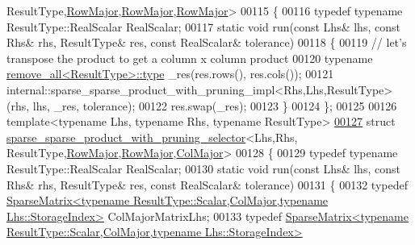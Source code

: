 \begin{DoxyCode}
      ResultType,\hyperlink{group__enums_ggaacded1a18ae58b0f554751f6cdf9eb13acfcde9cd8677c5f7caf6bd603666aae3}{RowMajor},\hyperlink{group__enums_ggaacded1a18ae58b0f554751f6cdf9eb13acfcde9cd8677c5f7caf6bd603666aae3}{RowMajor},\hyperlink{group__enums_ggaacded1a18ae58b0f554751f6cdf9eb13acfcde9cd8677c5f7caf6bd603666aae3}{RowMajor}>
00115 \{
00116   \textcolor{keyword}{typedef} \textcolor{keyword}{typename} ResultType::RealScalar RealScalar;
00117   \textcolor{keyword}{static} \textcolor{keywordtype}{void} run(\textcolor{keyword}{const} Lhs& lhs, \textcolor{keyword}{const} Rhs& rhs, ResultType& res, \textcolor{keyword}{const} RealScalar& tolerance)
00118   \{
00119     \textcolor{comment}{// let's transpose the product to get a column x column product}
00120     \textcolor{keyword}{typename} \hyperlink{group___sparse_core___module}{remove\_all<ResultType>::type} \_res(res.rows(), res.cols());
00121     internal::sparse\_sparse\_product\_with\_pruning\_impl<Rhs,Lhs,ResultType>(rhs, lhs, \_res, tolerance);
00122     res.swap(\_res);
00123   \}
00124 \};
00125 
00126 \textcolor{keyword}{template}<\textcolor{keyword}{typename} Lhs, \textcolor{keyword}{typename} Rhs, \textcolor{keyword}{typename} ResultType>
\hyperlink{struct_eigen_1_1internal_1_1sparse__sparse__product__with__pruning__selector_3_01_lhs_00_01_rhs_e175d5ee5e029960308385b07451d28e}{00127} \textcolor{keyword}{struct }\hyperlink{struct_eigen_1_1internal_1_1sparse__sparse__product__with__pruning__selector}{sparse\_sparse\_product\_with\_pruning\_selector}<Lhs,Rhs,
      ResultType,\hyperlink{group__enums_ggaacded1a18ae58b0f554751f6cdf9eb13acfcde9cd8677c5f7caf6bd603666aae3}{RowMajor},\hyperlink{group__enums_ggaacded1a18ae58b0f554751f6cdf9eb13acfcde9cd8677c5f7caf6bd603666aae3}{RowMajor},\hyperlink{group__enums_ggaacded1a18ae58b0f554751f6cdf9eb13a0cbd4bdd0abcfc0224c5fcb5e4f6669a}{ColMajor}>
00128 \{
00129   \textcolor{keyword}{typedef} \textcolor{keyword}{typename} ResultType::RealScalar RealScalar;
00130   \textcolor{keyword}{static} \textcolor{keywordtype}{void} run(\textcolor{keyword}{const} Lhs& lhs, \textcolor{keyword}{const} Rhs& rhs, ResultType& res, \textcolor{keyword}{const} RealScalar& tolerance)
00131   \{
00132     \textcolor{keyword}{typedef} 
      \hyperlink{group___sparse_core___module_class_eigen_1_1_sparse_matrix}{SparseMatrix<typename ResultType::Scalar,ColMajor,typename Lhs::StorageIndex>}
       ColMajorMatrixLhs;
00133     \textcolor{keyword}{typedef} 
      \hyperlink{group___sparse_core___module_class_eigen_1_1_sparse_matrix}{SparseMatrix<typename ResultType::Scalar,ColMajor,typename Lhs::StorageIndex>}

\end{DoxyCode}

